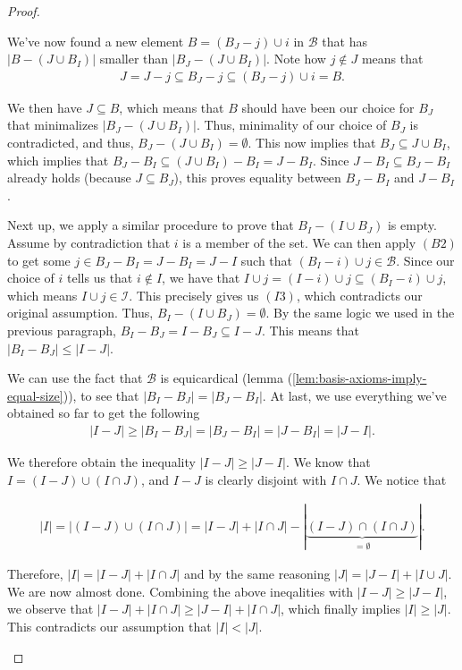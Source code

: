 \begin{proof}
\begin{enumerate}
        We've now found a new element $B=(B_J-j)\cup i$ in $\mathcal{B}$ that has $|B-(J\cup B_I)|$ smaller than $|B_J-(J\cup B_I)|$. Note how $j\notin J$ means that 
        \begin{align*}
        J=J-j\subseteq B_J-j\subseteq (B_J-j)\cup i = B. 
        \end{align*}

        We then have $J\subseteq B$, which means that $B$ should have been our choice for $B_J$ that minimalizes $|B_J-(J\cup B_I)|$. Thus, minimality of our choice of $B_J$ is contradicted, and thus, $B_J-(J\cup B_I)=\emptyset$. This now implies that $B_J\subseteq J\cup B_I$, which implies that $B_J-B_I\subseteq (J\cup B_I)-B_I=J-B_I$. Since $J-B_I\subseteq B_J-B_I$ already holds (because $J\subseteq B_J$), this proves equality between $B_J-B_I$ and $J-B_I$.

        Next up, we apply a similar procedure to prove that $B_I-(I\cup B_J)$ is empty. Assume by contradiction that $i$ is a member of the set. We can then apply $(B2)$ to get some $j\in B_J-B_I=J-B_I=J-I$ such that $(B_I-i)\cup j\in\mathcal{B}$. Since our choice of $i$ tells us that $i \notin I$, we have that $I\cup j = (I-i)\cup j \subseteq (B_I-i)\cup j$, which means $I\cup j\in\mathcal{I}$. This precisely gives us $(I3)$, which contradicts our original assumption. Thus, $B_I-(I\cup B_J)=\emptyset$. By the same logic we used in the previous paragraph, $B_I-B_J=I-B_J\subseteq I-J$. This means that $|B_I-B_J|\leq|I-J|$.

        We can use the fact that $\mathcal{B}$ is equicardical (lemma (\ref{lem:basis-axioms-imply-equal-size})), to see that $|B_I-B_J|=|B_J-B_I|$. At last, we use everything we've obtained so far to get the following
        \begin{align*}
        |I-J|\geq |B_I-B_J|=|B_J-B_I|=|J-B_I|=|J-I|.
        \end{align*}

        We therefore obtain the inequality $|I - J|\geq |J - I|$. We know that $ I = (I - J) \cup (I\cap J)$, and $I - J$ is clearly disjoint with $I \cap J$. We notice that

        \begin{align*}
        |I| = |(I - J)\cup (I \cap J)| = |I - J| + |I \cap J| - |\underbrace{(I - J) \cap (I \cap J)}_{ = \emptyset}|.
        \end{align*}

        Therefore, $|I| = |I-J| + |I \cap J|$ and by the same reasoning $|J| = |J - I| + |I\cup J|$. We are now almost done. Combining the above ineqalities with $|I - J|\geq |J - I|$, we observe that $|I-J| +|I \cap J|\geq |J - I| + |I \cap J|$, which finally implies $|I|\geq |J|$. This contradicts our assumption that $|I|< |J|$. 
        

\end{enumerate}
\end{proof}
